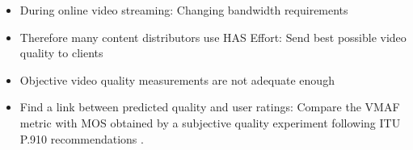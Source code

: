 \begin{itemize}
	\item During online video streaming:
	\newline Changing bandwidth requirements
	\item Therefore many content distributors use HAS \cite{seufert:2015:hassurvey}
	\newline Effort: Send best possible video quality to clients 
	\item Objective video quality measurements are not adequate enough
	\item Find a link between predicted quality and user ratings:
	\newline Compare the VMAF metric \cite{lin2013:mmf,lin2014:fvqa} with MOS obtained by a subjective quality experiment following ITU P.910 recommendations \cite{rec1998p}.
\end{itemize}